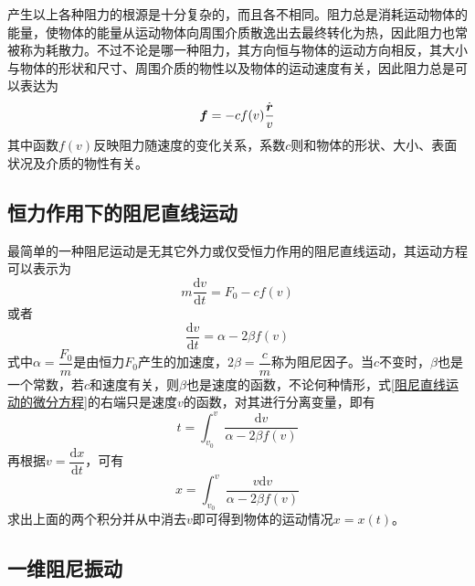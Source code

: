 产生以上各种阻力的根源是十分复杂的，而且各不相同。阻力总是消耗运动物体的能量，使物体的能量从运动物体向周围介质散逸出去最终转化为热，因此阻力也常被称为{\heiti 耗散力}。不过不论是哪一种阻力，其方向恒与物体的运动方向相反，其大小与物体的形状和尺寸、周围介质的物性以及物体的运动速度有关，因此阻力总是可以表达为
\begin{equation}
	\boldsymbol{f} = -cf(v) \frac{\dot{\boldsymbol{r}}}{v}
\end{equation}
其中函数$f(v)$反映阻力随速度的变化关系，系数$c$则和物体的形状、大小、表面状况及介质的物性有关。

\subsection{恒力作用下的阻尼直线运动}

最简单的一种阻尼运动是无其它外力或仅受恒力作用的阻尼直线运动，其运动方程可以表示为
\begin{equation*}
	m\frac{\mathrm{d} v}{\mathrm{d} t} = F_0 - cf(v)
\end{equation*}
或者
\begin{equation}
	\frac{\mathrm{d} v}{\mathrm{d} t} = \alpha-2\beta f(v)
	\label{阻尼直线运动的微分方程}
\end{equation}
式中$\alpha=\dfrac{F_0}{m}$是由恒力$F_0$产生的加速度，$2\beta = \dfrac{c}{m}$称为阻尼因子。当$c$不变时，$\beta$也是一个常数，若$c$和速度有关，则$\beta$也是速度的函数，不论何种情形，式\eqref{阻尼直线运动的微分方程}的右端只是速度$v$的函数，对其进行分离变量，即有
\begin{equation}
	t = \int_{v_0}^v \frac{\mathrm{d} v}{\alpha-2\beta f(v)}
\end{equation}
再根据$v = \dfrac{\mathrm{d} x}{\mathrm{d} t}$，可有
\begin{equation}
	x = \int_{v_0}^v \frac{v\mathrm{d} v}{\alpha-2\beta f(v)}
\end{equation}
求出上面的两个积分并从中消去$v$即可得到物体的运动情况$x = x(t)$。

\subsection{一维阻尼振动}

